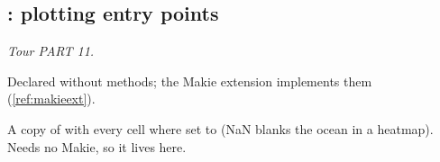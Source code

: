 \subsection{: plotting entry points}\label{ref:plotting}
\emph{Tour PART 11.}
\begin{fnlist}
\item[visualize\_field, visualize\_grid] Declared without methods; the Makie extension implements them (\ref{ref:makieext}).
\item[mask\_field(field, mask, value)] A copy of  with every cell where  set to  (NaN blanks the
  ocean in a heatmap). Needs no Makie, so it lives here.
\end{fnlist}
